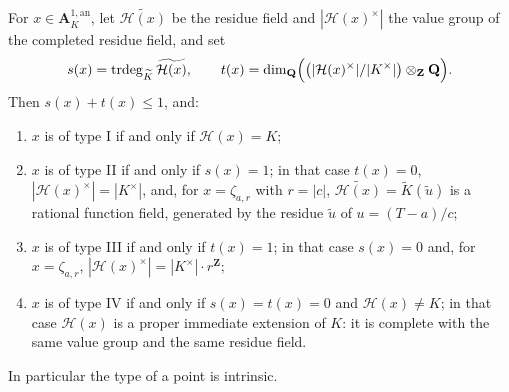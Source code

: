 \begin{proposition}
\label{prop:berk-type-invariants}
For $x\in\mathbf A^{1,\mathrm{an}}_K$, let
$\widetilde{\mathcal H(x)}$ be the residue field and
$|\mathcal H(x)^\times|$ the value group of the completed residue
field, and set
\[
 s(x)=\operatorname{trdeg}_{\widetilde K}\widetilde{\mathcal H(x)},
 \qquad
 t(x)=\dim_{\mathbf Q}
 \Bigl(\bigl(|\mathcal H(x)^\times|/|K^\times|\bigr)
 \otimes_{\mathbf Z}\mathbf Q\Bigr).
\]
Then $s(x)+t(x)\leq1$, and:
\begin{enumerate}
\item $x$ is of type I if and only if $\mathcal H(x)=K$;
\item $x$ is of type II if and only if $s(x)=1$; in that case
      $t(x)=0$, $|\mathcal H(x)^\times|=|K^\times|$, and, for
      $x=\zeta_{a,r}$ with $r=|c|$,
      $\widetilde{\mathcal H(x)}=\widetilde K(\tilde u)$ is a rational
      function field, generated by the residue $\tilde u$ of
      $u=(T-a)/c$;
\item $x$ is of type III if and only if $t(x)=1$; in that case
      $s(x)=0$ and, for $x=\zeta_{a,r}$,
      $|\mathcal H(x)^\times|=|K^\times|\cdot r^{\mathbf Z}$;
\item $x$ is of type IV if and only if $s(x)=t(x)=0$ and
      $\mathcal H(x)\neq K$; in that case $\mathcal H(x)$ is a
      proper immediate extension of $K$: it is complete with the same
      value group and the same residue field.
\end{enumerate}
In particular the type of a point is intrinsic.
\end{proposition}

